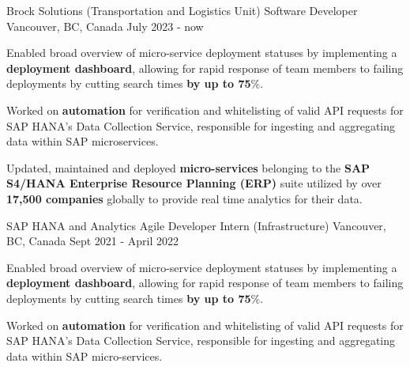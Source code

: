 
\begin{cventries}
 \cventry
    {Brock Solutions (Transportation and Logistics Unit)} %
    {Software Developer} %
    {Vancouver, BC, Canada} %
    {July 2023 - now} %
{
      \begin{cvitems} %
      \item {Enabled broad overview of micro-service deployment statuses by implementing a \textbf{deployment dashboard}, allowing for rapid response of team members to failing deployments by cutting search times\textbf{ by up to 75}\%.}
      \item {Worked on \textbf{automation} for verification and whitelisting of valid API requests for SAP HANA's Data Collection Service, responsible for ingesting and aggregating data within SAP microservices.}
       \item {Updated, maintained and deployed \textbf{micro-services} belonging to the \textbf{SAP S4/HANA Enterprise Resource Planning (ERP)} suite utilized by over \textbf{17,500 companies} globally to provide real time analytics for their data.}
      \end{cvitems}
    }      
 \cventry
    {SAP HANA and Analytics} %
    {Agile Developer Intern (Infrastructure)} %
    {Vancouver, BC, Canada} %
    {Sept 2021 - April 2022} %
    {
      \begin{cvitems} %
      \item {Enabled broad overview of micro-service deployment statuses by implementing a \textbf{deployment dashboard}, allowing for rapid response of team members to failing deployments by cutting search times\textbf{ by up to 75}\%.}
      \item {Worked on \textbf{automation} for verification and whitelisting of valid API requests for SAP HANA's Data Collection Service, responsible for ingesting and aggregating data within SAP micro-services.}

\end{cvitems}}
\end{cventries}
